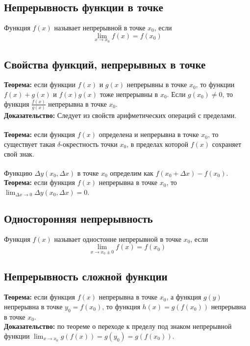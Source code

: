 \documentclass{article}
\begin{document}
    \newpage

    \section{}

    \subsection*{Непрерывность функции в точке}
        Функция $f(x)$ называет непрерывной в точке $x_0$, если 
        \[ \lim_{x \to x_0} f(x) = f(x_0) \]


    \subsection*{Свойства функций, непрерывных в точке}
        \textbf{Теорема:} если функции $f(x)$ и $g(x)$ непрерывны в точке $x_0$, то функции $f(x) + g(x)$ и $f(x)g(x)$ тоже непрерывны в $x_0$.
        Если $g(x_0) \neq 0$, то функция $\frac{f(x)}{g(x)}$ непрерывна в точке $x_0$.
        \\
        \textbf{Доказательство:} 
        Следует из свойств арифметических операций с пределами.
        \\
        \\
        \textbf{Теорема:} если функция $f(x)$ определена и непрерывна в точке $x_0$, то существует такая $\delta$-окрестность точки $x_0$,
        в пределах которой $f(x)$ сохраняет свой знак.
        \\
        \\
        Функцию $\Delta y(x_0, \Delta x)$ в точке $x_0$ определим как $f(x_0 + \Delta x) - f(x_0)$.
        \\
        \textbf{Теорема:} если функция $f(x)$ непрерывна в точке $x_0$, то $\lim_{\Delta x \to 0} \Delta y(x_0, \Delta x) = 0$.  
        
         
    \subsection*{Односторонняя непрерывность}
        Функция $f(x)$ называет одностонне непрерывной в точке $x_0$, если 
        \[ \lim_{x \to x_0 \pm 0} f(x) = f(x_0) \]
        
        
    \subsection*{Непрерывность сложной функции}
        \textbf{Теорема:} если функция $f(x)$ непрерывна в точке $x_0$, а функция $g(y)$ непрерывна в точке $y_0 = f(x_0)$, то функция $h(x) = g(f(x_0))$ непрерывна
        в точке $x_0$.
        \\
        \textbf{Доказательство:} по теореме о переходе к пределу под знаком непрерывной функции $\lim_{x \to x_0} g(f(x)) = g(y_0) = g(f(x_0))$.
        
\end{document}
